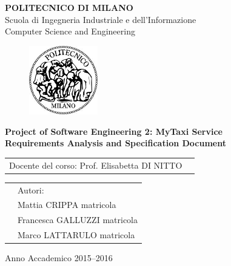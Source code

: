 \documentclass[a4paper, 12pt]{report}
\begin{document}
\begin{titlepage}

\begin{center}
\Large
\textbf{POLITECNICO DI MILANO} \\
\Large
Scuola di Ingegneria Industriale e dell'Informazione \\
Computer Science and Engineering
\end{center}

\addvspace{0.8cm}
\begin{figure}[h]
\begin{center}
\includegraphics[width=3cm]{cpt/img/polimi}
\end{center}
\end{figure}

\addvspace{0.1cm}
\begin{center}
\LARGE

\textbf{Project of Software Engineering 2: MyTaxi Service \\
Requirements Analysis and Specification Document}

\end{center}

\addvspace{0.5cm}
\Large
\begin{center}
\begin{tabular}{p{}p{}}
Docente del corso: Prof. Elisabetta DI NITTO \\
\end{tabular}
\end{center}

\addvspace{0.7cm}
\Large
\begin{center}
\begin{tabular}{p{}p{}}
& Autori: \\
& Mattia CRIPPA     matricola\\
& Francesca GALLUZZI     matricola\\
& Marco LATTARULO     matricola
\end{tabular}
\end{center}

\vfill
\Large
\begin{center}
Anno Accademico 2015--2016
\end{center}
\end{titlepage}

\clearpage

\tableofcontents
\clearpage

\listoffigures
\clearpage



\clearpage


\clearpage


\clearpage


\clearpage
\end{document}
